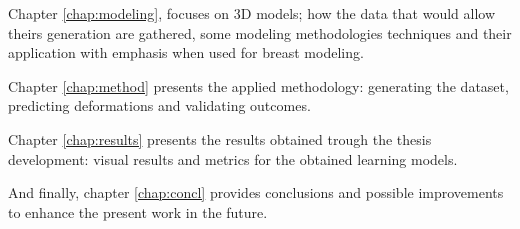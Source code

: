 Chapter \ref{chap:modeling}, focuses on 3D models; how the data that would allow theirs generation are gathered, some modeling methodologies techniques and their application with emphasis when used for breast modeling.

Chapter \ref{chap:method} presents the applied methodology: generating the dataset, predicting deformations and validating outcomes.

Chapter \ref{chap:results} presents the results obtained trough the thesis development: visual results and metrics for the obtained learning models.

And finally, chapter \ref{chap:concl} provides conclusions and possible improvements to enhance the present work in the future.
